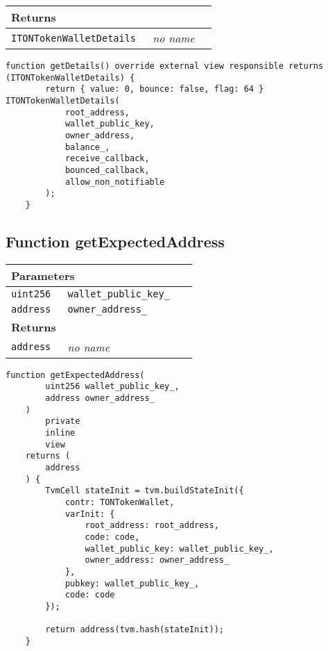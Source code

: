 \ifsoltables
\noindent\begin{tabular}{|l|l|p{5cm}|}\hline
\multicolumn{3}{|l|}{\bf Returns}\\\hline
\tt ITONTokenWalletDetails & {\em no name} &\\\hline
\end{tabular}
\fi

\vspace{2cm}

\begin{lstlisting}[firstnumber=72]
    function getDetails() override external view responsible returns (ITONTokenWalletDetails) {
        return { value: 0, bounce: false, flag: 64 } ITONTokenWalletDetails(
            root_address,
            wallet_public_key,
            owner_address,
            balance_,
            receive_callback,
            bounced_callback,
            allow_non_notifiable
        );
    }
\end{lstlisting}

\subsection{Function getExpectedAddress}


\ifsoltables
\noindent\begin{tabular}{|l|l|p{5cm}|}\hline
\multicolumn{3}{|l|}{\bf Parameters}\\\hline
\tt uint256 & \tt wallet\_{}public\_{}key\_{} &\\\hline
\tt address & \tt owner\_{}address\_{} &\\\hline
\multicolumn{3}{|l|}{\bf Returns}\\\hline
\tt address & {\em no name} &\\\hline
\end{tabular}
\fi

\vspace{2cm}

\begin{lstlisting}[firstnumber=620]
    function getExpectedAddress(
        uint256 wallet_public_key_,
        address owner_address_
    )
        private
        inline
        view
    returns (
        address
    ) {
        TvmCell stateInit = tvm.buildStateInit({
            contr: TONTokenWallet,
            varInit: {
                root_address: root_address,
                code: code,
                wallet_public_key: wallet_public_key_,
                owner_address: owner_address_
            },
            pubkey: wallet_public_key_,
            code: code
        });

        return address(tvm.hash(stateInit));
    }
\end{lstlisting}

